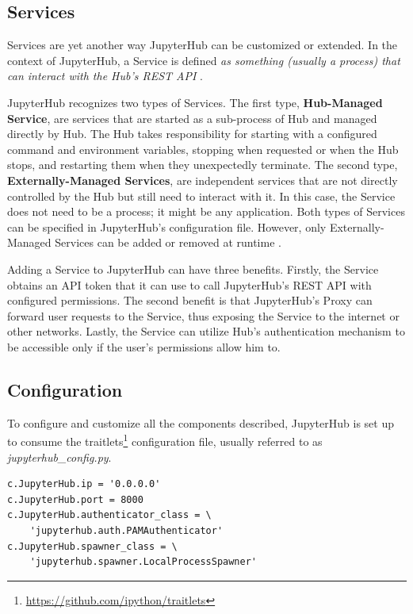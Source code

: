 \documentclass[
  digital,     %
  oneside,     %
  nosansbold,  %
  nocolorbold, %
  lof,         %
  nolot,         %
]{fithesis4}
\newenvironment{code}{\captionsetup{type=listing}}{}
\begin{document}
\subsection{Services}
\label{subsec:jupyterhub:services}
Services are yet another way JupyterHub can be customized or extended. In the context of JupyterHub, a Service is defined \emph{as something (usually a process) that can interact with the Hub's REST API} \cite{jupyterhub_service}.

JupyterHub recognizes two types of Services. The first type, \textbf{Hub-Managed Service}, are services that are started as a sub-process of Hub and managed directly by Hub. The Hub takes responsibility for starting with a configured command and environment variables, stopping when requested or when the Hub stops, and restarting them when they unexpectedly terminate. The second type, \textbf{Externally-Managed Services}, are independent services that are not directly controlled by the Hub but still need to interact with it. In this case, the Service does not need to be a process; it might be any application. Both types of Services can be specified in JupyterHub's configuration file. However, only Externally-Managed Services can be added or removed at runtime \cite{jupyterhub_service}.

Adding a Service to JupyterHub can have three benefits. Firstly, the Service obtains an API token that it can use to call JupyterHub's REST API with configured permissions. The second benefit is that JupyterHub's Proxy can forward user requests to the Service, thus exposing the Service to the internet or other networks. Lastly, the Service can utilize Hub's authentication mechanism to be accessible only if the user's permissions allow him to.

\subsection{Configuration}
\label{subsec:jupyterhub:configuration}

To configure and customize all the components described, JupyterHub is set up to consume the traitlets\footnote{\url{https://github.com/ipython/traitlets}} configuration file, usually referred to as \emph{jupyterhub\_config.py}.

\begin{code}
\label{lst:jupyterhub:config}
\begin{verbatim}
c.JupyterHub.ip = '0.0.0.0'
c.JupyterHub.port = 8000 
c.JupyterHub.authenticator_class = \ 
    'jupyterhub.auth.PAMAuthenticator'
c.JupyterHub.spawner_class = \
    'jupyterhub.spawner.LocalProcessSpawner'
\end{verbatim}
\end{code}
\end{document}
